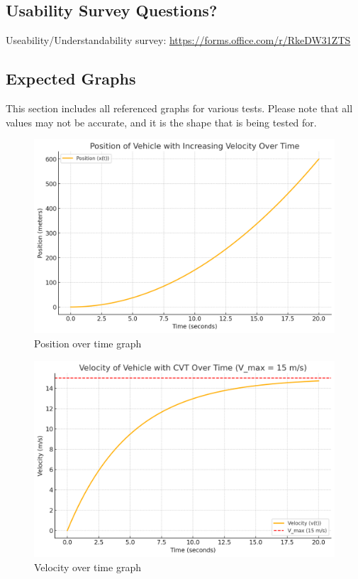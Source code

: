 \documentclass[12pt, titlepage]{article}
\begin{document}
\subsection{Usability Survey Questions?}

Useability/Understandability survey:
\url{https://forms.office.com/r/RkeDW31ZTS}

\subsection{Expected Graphs}
This section includes all referenced graphs for various tests. Please note that all values may not be accurate, and it is the shape that is being tested for.

\begin{figure}[H]
  \centering
  \includegraphics[width=\textwidth]{graphs/position.png}
  \caption{Position over time graph}
  \label{fig:position_graph}
\end{figure}

\begin{figure}[H]
  \centering
  \includegraphics[width=\textwidth]{graphs/velocity.png}
  \caption{Velocity over time graph}
  \label{fig:velocity_graph}
\end{figure}
\end{document}
